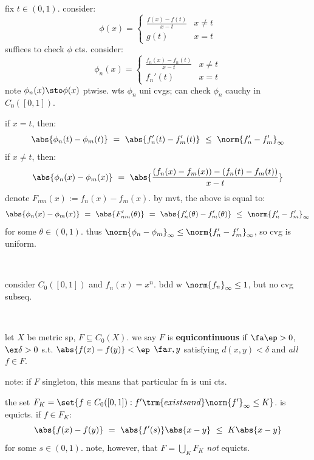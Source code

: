 \begin{pf}[source=Primary Source Material]
    fix $t\in(0,1)$. consider:
	\begin{equation*}
		\phi(x) =
		\begin{cases}
			\frac{f(x)-f(t)}{x-t} & x \neq t \\ g(t) & x = t
		\end{cases}
	\end{equation*}
	suffices to check $\phi$ cts. consider:
	\begin{equation*}
		\phi_{n}(x) =
		\begin{cases}
			\frac{f_{n}(x)-f_{n}(t)}{x-t} & x \neq t \\ f_{n}'(t) & x = t
		\end{cases}
	\end{equation*}
	note $\phi_{n}(x)\sto\phi(x)$ ptwise.
	wts $\phi_{n}$ uni cvgs; can check $\phi_{n}$ cauchy in $C_{0}([0,1])$.

	if $x=t$, then:
	\begin{equation*}
	    \abs{\phi_{n}(t)-\phi_{m}(t)}
		\ = \ \abs{f_{n}'(t)-f_{m}'(t)}
		\ \leq \ \norm{f_{n}'-f_{m}'}_{\infty}
	\end{equation*}
	if $x\neq t$, then:
	\begin{equation*}
		\abs{\phi_{n}(x)-\phi_{m}(x)} \ = \
		\abs{\frac{(f_{n}(x)-f_{m}(x))-(f_{n}(t)-f_{m}(t))}{x-t}}
	\end{equation*}
	denote $F_{nm}(x):=f_{n}(x)-f_{m}(x)$. by mvt, the above is equal to:
	\begin{equation*}
	    \abs{\phi_{n}(x)-\phi_{m}(x)}
		\ = \ \abs{F_{nm}'(\theta)}
		\ = \ \abs{f_{n}'(\theta)-f_{m}'(\theta)}
		\ \leq \ \norm{f_{n}'-f_{m}'}_{\infty}
	\end{equation*}
	for some $\theta\in(0,1)$.
	thus $\norm{\phi_{n}-\phi_{m}}_{\infty}\leq\norm{f_{n}'-f_{m}'}_{\infty}$,
	so cvg is uniform.
\end{pf} \

\begin{xmp}[source=Primary Source Material]
    consider $C_{0}([0,1])$ and $f_{n}(x)=x^{n}$.
	bdd w $\norm{f_{n}}_{\infty}\leq1$, but no cvg subseq.
\end{xmp} \

\begin{defn}
    let $X$ be metric sp, $F\subseteq C_{0}(X)$.
	we say $F$ is \textbf{equicontinuous} if $\fa\ep>0$, $\ex\delta>0$ s.t.
	$\abs{f(x)-f(y)}<\ep$ $\fa x,y$ satisfying $d(x,y)<\delta$ and \textit{all} $f\in F$.
\end{defn}
note: if $F$ singleton, this means that particular fn is uni cts.

\begin{xmp}[source=Primary Source Material]
    the set $F_{K}=\set{f\in C_{0}([0,1]) : f' \trm{ exists and } \norm{f'}_{\infty}\leq K}$.
	is equicts. if $f\in F_{K}$:
	\begin{equation*}
	    \abs{f(x)-f(y)} \ = \ \abs{f'(s)}\abs{x-y} \ \leq \ K\abs{x-y}
	\end{equation*}
	for some $s\in(0,1)$. note, however, that $F=\bigcup_{K}F_{K}$ \textit{not} equicts.
\end{xmp}



